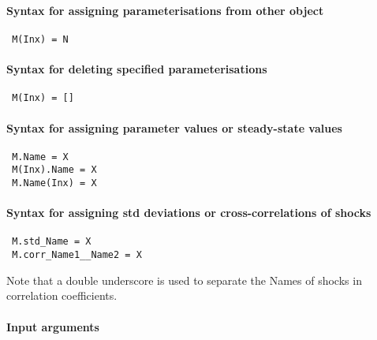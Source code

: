 


	\paragraph{Syntax for assigning parameterisations from other object}
 
 \begin{verbatim}
 M(Inx) = N
 \end{verbatim}
 
 \paragraph{Syntax for deleting specified parameterisations}
 
 \begin{verbatim}
 M(Inx) = []
 \end{verbatim}
 
 \paragraph{Syntax for assigning parameter values or steady-state values}
 
 \begin{verbatim}
 M.Name = X
 M(Inx).Name = X
 M.Name(Inx) = X
 \end{verbatim}
 
 \paragraph{Syntax for assigning std deviations or cross-correlations of
 shocks}
 
 \begin{verbatim}
 M.std_Name = X
 M.corr_Name1__Name2 = X
 \end{verbatim}
 
 Note that a double underscore is used to separate the Names of shocks in
 correlation coefficients.
 
 \paragraph{Input arguments}
 
